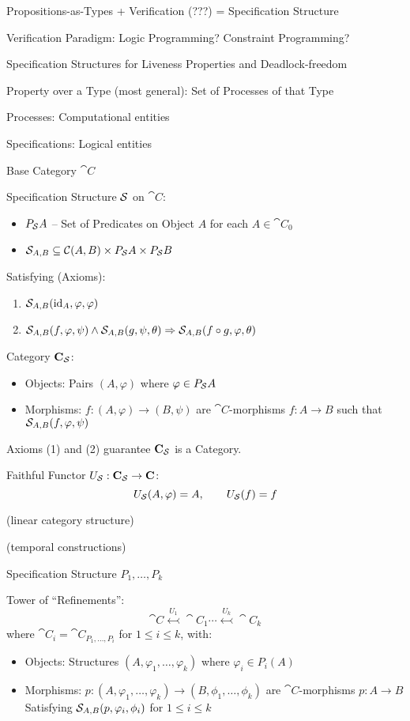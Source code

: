 Propositions-as-Types + Verification (???) = Specification Structure

Verification Paradigm: Logic Programming? Constraint Programming?

Specification Structures for Liveness Properties and Deadlock-freedom

Property over a Type (most general): Set of Processes of that Type

Processes: Computational entities

Specifications: Logical entities

Base Category $\cat{C}$

Specification Structure $\mathcal{S}$ on $\cat{C}$:
\begin{itemize}
  \item $P_{\mathcal{S}} A$ -- Set of Predicates on Object $A$ for each
    $A \in \cat{C}_0$
  \item $\mathcal{S}_{A,B} \subseteq \mathcal{C}(A,B) \times P_{\mathcal{S}}
    A \times P_{\mathcal{S}} B$
\end{itemize}
Satisfying (Axioms):
\begin{enumerate}
  \item $\mathcal{S}_{A,B}(\mathrm{id}_A,\varphi,\varphi)$
  \item $\mathcal{S}_{A,B}(f,\varphi,\psi)
    \wedge \mathcal{S}_{A,B}(g,\psi,\theta)
    \Rightarrow \mathcal{S}_{A,B}(f \circ g, \varphi, \theta)$
\end{enumerate}

Category $\mathbf{C}_{\mathcal{S}}$:
\begin{itemize}
  \item Objects: Pairs $(A,\varphi)$ where $\varphi \in P_{\mathcal{S}}A$
  \item Morphisms: $f : (A,\varphi) \rightarrow (B,\psi)$ are
    $\cat{C}$-morphisms $f : A \rightarrow B$ such that
    $\mathcal{S}_{A,B}(f,\varphi,\psi)$
\end{itemize}
Axioms (1) and (2) guarantee $\mathbf{C}_{\mathcal{S}}$ is a Category.

Faithful Functor $U_\mathcal{S} : \mathbf{C}_\mathcal{S} \rightarrow
\mathbf{C}$:
\[
  U_{\mathcal{S}}(A,\varphi) = A, \quad\quad U_{\mathcal{S}}(f) = f
\]

(linear category structure) %

(temporal constructions)

Specification Structure $P_1, \ldots, P_k$

Tower of ``Refinements'':
\[
  \cat{C} \stackrel{U_1}{\leftarrowtail} \cat{C}_1 \cdots
    \stackrel{U_k}{\leftarrowtail} \cat{C}_k
\]
where $\cat{C}_i = \cat{C}_{P_1, \ldots, P_i}$ for $1 \leq i \leq k$,
with:
\begin{itemize}
  \item Objects: Structures $(A, \varphi_1, \ldots, \varphi_k)$ where
    $\varphi_i \in P_i(A)$
  \item Morphisms: $p : (A, \varphi_1, \ldots, \varphi_k) \rightarrow
    (B, \phi_1, \ldots, \phi_k)$ are $\cat{C}$-morphisms $p : A
    \rightarrow B$ Satisfying $\mathcal{S}_{A,B}(p,\varphi_i,\phi_i)$
    for $1 \leq i \leq k$
\end{itemize}

